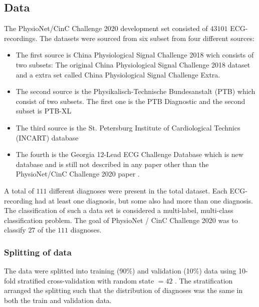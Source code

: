 \subsection{Data}
The PhysioNet/CinC Challenge 2020 development set consisted of $43101$ ECG-recordings. The datasets were sourced from six subset from four different sources:

\begin{itemize}
    \item The first source is China Physiological Signal Challenge 2018 wich consists of two subsets: The original China Physiological Signal Challenge 2018 dataset \cite{liu_open_2018} and a extra set called China Physiological Signal Challenge Extra. 
    \item The second source is the Physikalisch-Technische Bundesanstalt (PTB) which consist of two subsets. The first one is the PTB Diagnostic \cite{bousseljot_nutzung_2009} and the second subset is PTB-XL \cite{wagner_ptb-xl_2020-1}
    \item The third source is the St. Petersburg Institute of Cardiological Technics (INCART) database \cite{goldberger_physiobank_2000}
    \item  The fourth is the Georgia 12-Lead ECG Challenge Database which is new database and is still not described in any paper other than the PhysioNet/CinC Challenge 2020 paper \cite{alday_classification_2020}.
\end{itemize}
A total of $111$ different diagnoses were present in the total dataset. Each ECG-recording had at least one diagnosis, but some also had more than one diagnosis. The classification of such a data set is considered a multi-label, multi-class classification problem. The goal of PhysioNet / CinC Challenge 2020 was to classify $27$ of the $111$ diagnoses. 



\subsubsection{Splitting of data}

The data were splitted into training (90\%) and validation (10\%) data using 10-fold stratified cross-validation with random state $=42$ \cite{pedregosa_scikit-learn_2011}. The stratification arranged the splitting such that the distribution of diagnoses was the same in both the train and validation data.

